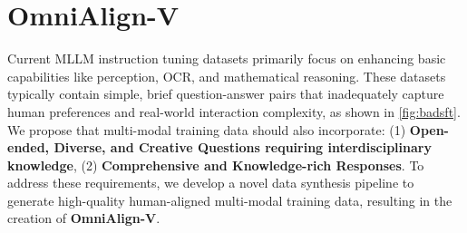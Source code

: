 \begin{comment}
Sec 4 主要讲我们怎样构造多模态数据 (for Human Alignment)，按这个 pipeline 写：
1. 既然要构造，首先讲现在数据有什么样的问题，我们希望构造怎样的数据 (长回复、有格式、follow instruction, etc.)？
2. 总结我们设计 data synthesis pipeline 的版图。两个维度：1. 图片类型：自然图像，人工图像 (艺术创作、专业领域图像 (电路图、学科图示等)、图表 (目的为展示数据：饼图、折线图等)、Infographics (由复杂图文组成，用以传递信息，如海报等))；2. 任务类型：blahblah；3. 图像类型与任务类型间存在关系 (若画成二维应该是一个稀疏矩阵)。
3. 如何挑图 (自然图像)：须有实验结果佐证
4. 如何生成 QA (拣值得一提的部分说)：1. 如何生成回复；2. 如何 refine 回复；3. DPO 数据生成
\end{comment}

\section{OmniAlign-V}

Current MLLM instruction tuning datasets primarily focus on enhancing basic capabilities like perception, OCR, and mathematical reasoning. 
These datasets typically contain simple, brief question-answer pairs that inadequately capture human preferences and real-world interaction complexity, as shown in \cref{fig:badsft}. 
We propose that multi-modal training data should also incorporate: (1) \textbf{Open-ended, Diverse, and Creative Questions requiring interdisciplinary knowledge}, (2) \textbf{Comprehensive and Knowledge-rich Responses}. To address these requirements, we develop a novel data synthesis pipeline to generate high-quality human-aligned multi-modal training data, resulting in the creation of \textbf{OmniAlign-V}.



